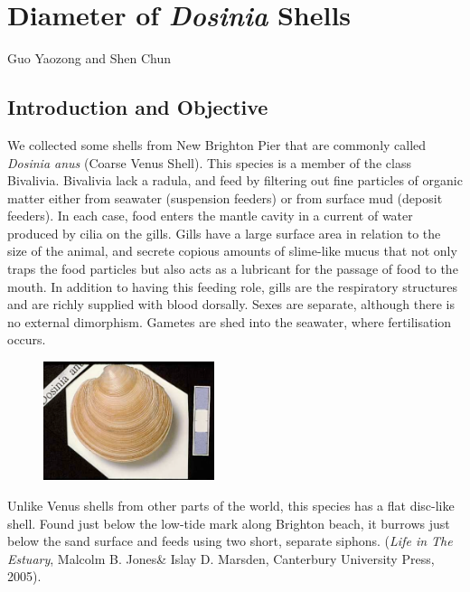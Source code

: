 \section{Diameter of \textit{Dosinia} Shells}
\begin{center}
Guo Yaozong and Shen Chun
\end{center}

\subsection{Introduction and Objective}

We collected some shells from New Brighton Pier that are commonly called \textit{Dosinia anus} (Coarse Venus Shell). This species is a member of the class Bivalivia. Bivalivia lack a radula, and feed by filtering out fine particles of organic matter either from seawater (suspension feeders) or from surface mud (deposit feeders). In each case, food enters the mantle cavity in a current of water produced by cilia on the gills. Gills have a large surface area in relation to the size of the animal, and secrete copious amounts of slime-like mucus that not only traps the food particles but also acts as a lubricant for the passage of food to the mouth. In addition to having this feeding role, gills are the respiratory structures and are richly supplied with blood dorsally. Sexes are separate, although there is no external dimorphism. Gametes are shed into the seawater, where fertilisation occurs.

\begin{figure}[ht]
\begin{center}
\includegraphics[width=5cm]{figures/DosiniaShellPhoto.pdf}
\end{center}
\end{figure}

Unlike Venus shells from other parts of the world, this species has a flat disc-like shell. Found just below the low-tide mark along Brighton beach, it burrows just below the sand surface and feeds using two short, separate siphons. ({\it Life in The Estuary}, Malcolm B. Jones\& Islay D. Marsden, Canterbury University Press, 2005).

